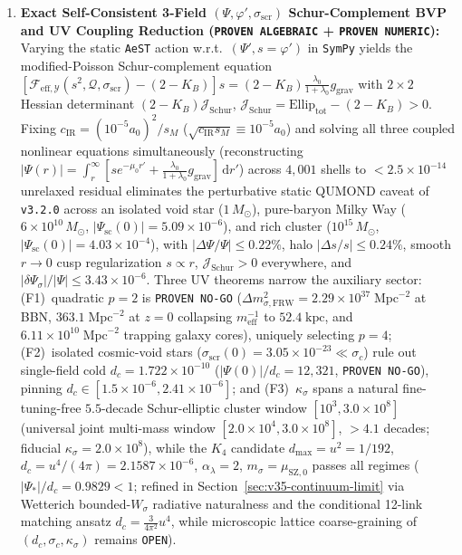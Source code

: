 \documentclass[11pt,a4paper]{article}
\begin{document}
\begin{enumerate}
\item \textbf{Exact Self-Consistent 3-Field $(\Psi,\varphi',\sigma_{\mathrm{scr}})$ Schur-Complement BVP and UV Coupling Reduction (\texttt{PROVEN ALGEBRAIC} + \texttt{PROVEN NUMERIC}):} Varying the static \texttt{AeST} action w.r.t.\ $(\Psi',s=\varphi')$ in \texttt{SymPy} yields the modified-Poisson Schur-complement equation $[\mathcal{F}_{\mathrm{eff},\mathcal{Y}}(s^2,\mathcal{Q},\sigma_{\mathrm{scr}})-(2-K_B)]s = (2-K_B)\frac{\lambda_0}{1+\lambda_0}g_{\mathrm{grav}}$ with $2\times 2$ Hessian determinant $(2-K_B)\mathcal{J}_{\mathrm{Schur}}$, $\mathcal{J}_{\mathrm{Schur}}=\mathrm{Ellip}_{\mathrm{tot}}-(2-K_B)>0$. Fixing $c_{\mathrm{IR}}=(10^{-5}a_0)^2/s_M$ ($\sqrt{c_{\mathrm{IR}}s_M}\equiv 10^{-5}a_0$) and solving all three coupled nonlinear equations simultaneously (reconstructing $|\Psi(r)|=\int_r^\infty[s e^{-\mu_0 r'}+\frac{\lambda_0}{1+\lambda_0}g_{\mathrm{grav}}]\,\mathrm{d}r'$) across $4{,}001$ shells to $<2.5\times 10^{-14}$ unrelaxed residual eliminates the perturbative static QUMOND caveat of \texttt{v3.2.0} across an isolated void star ($1\,M_\odot$), pure-baryon Milky Way ($6\times 10^{10}\,M_\odot$, $|\Psi_{\mathrm{sc}}(0)|=5.09\times 10^{-6}$), and rich cluster ($10^{15}\,M_\odot$, $|\Psi_{\mathrm{sc}}(0)|=4.03\times 10^{-4}$), with $|\Delta\Psi/\Psi|\le 0.22\%$, halo $|\Delta s/s|\le 0.24\%$, smooth $r\to 0$ cusp regularization $s\propto r$, $\mathcal{J}_{\mathrm{Schur}}>0$ everywhere, and $|\delta\Psi_\sigma|/|\Psi|\le 3.43\times 10^{-6}$. Three UV theorems narrow the auxiliary sector: (F1)~quadratic $p=2$ is \texttt{PROVEN NO-GO} ($\Delta m_{\sigma,\mathrm{FRW}}^2 = 2.29\times 10^{37}\;\mathrm{Mpc}^{-2}$ at BBN, $363.1\;\mathrm{Mpc}^{-2}$ at $z=0$ collapsing $m_{\mathrm{eff}}^{-1}$ to $52.4\;\mathrm{kpc}$, and $6.11\times 10^{10}\;\mathrm{Mpc}^{-2}$ trapping galaxy cores), uniquely selecting $p=4$; (F2)~isolated cosmic-void stars ($\sigma_{\mathrm{scr}}(0)=3.05\times 10^{-23}\ll\sigma_c$) rule out single-field cold $d_c=1.722\times 10^{-10}$ ($|\Psi(0)|/d_c=12{,}321$, \texttt{PROVEN NO-GO}), pinning $d_c\in[1.5\times 10^{-6},2.41\times 10^{-6}]$; and (F3)~$\kappa_\sigma$ spans a natural fine-tuning-free $5.5$-decade Schur-elliptic cluster window $[10^3,3.0\times 10^8]$ (universal joint multi-mass window $[2.0\times 10^4,3.0\times 10^8]$, $>4.1$ decades; fiducial $\kappa_\sigma=2.0\times 10^8$), while the $K_4$ candidate $d_{\max}=u^2=1/192$, $d_c=u^4/(4\pi)=2.1587\times 10^{-6}$, $\alpha_\lambda=2$, $m_\sigma=\mu_{\mathrm{SZ},0}$ passes all regimes ($|\Psi_*|/d_c=0.9829<1$; refined in Section~\ref{sec:v35-continuum-limit} via Wetterich bounded-$W_\sigma$ radiative naturalness and the conditional 12-link matching ansatz $d_c=\frac{3}{4\pi^2}u^4$, while microscopic lattice coarse-graining of $(d_c,\sigma_c,\kappa_\sigma)$ remains \texttt{OPEN}).
\end{enumerate}
\end{document}

